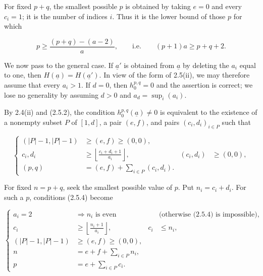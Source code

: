 
For fixed $p+q$, the smallest possible $p$ is obtained by taking $e=0$
and every $c_i=1$; it is the number of indices $i$.  Thus it is the lower
bound of those $p$ for which

\begin{equation*}
p\geq\frac{(p+q)-(a-2)}{a},
\qquad\text{i.e.}\qquad (p+1)a\geq p+q+2.
\end{equation*}

We now pass to the general case.  If $\underline a'$ is obtained from
$\underline a$ by deleting the $a_i$ equal to one, then
$H(\underline a)=H(\underline a')$.  In view of the form of 2.5(ii), we may
therefore assume that every $a_i>1$.  If $d=0$, then
$h_0^{p,q}=0$ and the assertion is correct; we lose no generality by
assuming $d>0$ and $a_d=\sup_i(a_i)$.

By 2.4(ii) and (2.5.2), the condition
$h_0^{p,q}(\underline a)\ne0$ is equivalent to the existence of a nonempty
subset $P$ of $[1,d]$, a pair $(e,f)$, and pairs
$(c_i,d_i)_{i\in P}$ such that

\begin{equation}\tag{2.5.4}
\left\{
\begin{aligned}
(|P|-1,|P|-1)&\geq(e,f)\geq(0,0),\\
c_i,d_i&\geq
\left\lfloor\frac{c_i+d_i+1}{a_i}\right\rfloor,
& (c_i,d_i)&\geq(0,0),\\
(p,q)&=(e,f)+\sum_{i\in P}(c_i,d_i).&&
\end{aligned}
\right.
\end{equation}

For fixed $n=p+q$, seek the smallest possible value of $p$.  Put
$n_i=c_i+d_i$.  For such a $p$, conditions (2.5.4) become


\begin{equation}\tag{2.5.5}
\left\{
\begin{aligned}
a_i=2&\Longrightarrow n_i\text{ is even}
&&\text{(otherwise (2.5.4) is impossible)},\\
c_i&\geq\left\lfloor\frac{n_i+1}{a_i}\right\rfloor,
&c_i&\leq n_i,\\
(|P|-1,|P|-1)&\geq(e,f)\geq(0,0),&&\\
n&=e+f+\sum_{i\in P}n_i,&&\\
p&=e+\sum_{i\in P}c_i.&&
\end{aligned}
\right.
\end{equation}

